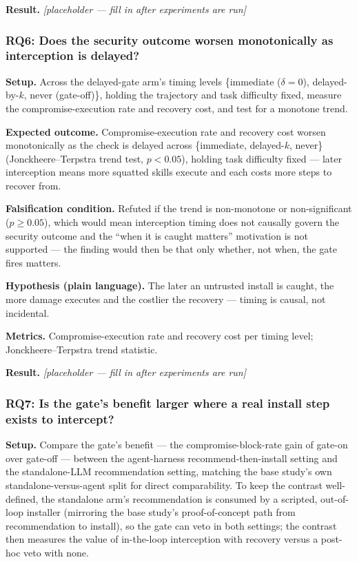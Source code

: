 \documentclass[11pt]{article}
\newcommand{\ph}{\textit{[placeholder --- fill in after experiments are run]}}
\begin{document}
\textbf{Result.} \ph

\subsubsection{RQ6: Does the security outcome worsen monotonically as interception is delayed?}
\textbf{Setup.} Across the delayed-gate arm's timing levels \{immediate ($\delta = 0$), delayed-by-$k$, never (gate-off)\}, holding the trajectory and task difficulty fixed, measure the compromise-execution rate and recovery cost, and test for a monotone trend.

\textbf{Expected outcome.} Compromise-execution rate and recovery cost worsen monotonically as the check is delayed across \{immediate, delayed-$k$, never\} (Jonckheere--Terpstra trend test, $p < 0.05$), holding task difficulty fixed --- later interception means more squatted skills execute and each costs more steps to recover from.

\textbf{Falsification condition.} Refuted if the trend is non-monotone or non-significant ($p \geq 0.05$), which would mean interception timing does not causally govern the security outcome and the ``when it is caught matters'' motivation is not supported --- the finding would then be that only whether, not when, the gate fires matters.

\textbf{Hypothesis (plain language).} The later an untrusted install is caught, the more damage executes and the costlier the recovery --- timing is causal, not incidental.

\textbf{Metrics.} Compromise-execution rate and recovery cost per timing level; Jonckheere--Terpstra trend statistic.

\textbf{Result.} \ph

\subsubsection{RQ7: Is the gate's benefit larger where a real install step exists to intercept?}
\textbf{Setup.} Compare the gate's benefit --- the compromise-block-rate gain of gate-on over gate-off --- between the agent-harness recommend-then-install setting and the standalone-LLM recommendation setting, matching the base study's own standalone-versus-agent split for direct comparability. To keep the contrast well-defined, the standalone arm's recommendation is consumed by a scripted, out-of-loop installer (mirroring the base study's proof-of-concept path from recommendation to install), so the gate can veto in both settings; the contrast then measures the value of in-the-loop interception with recovery versus a post-hoc veto with none.
\end{document}
